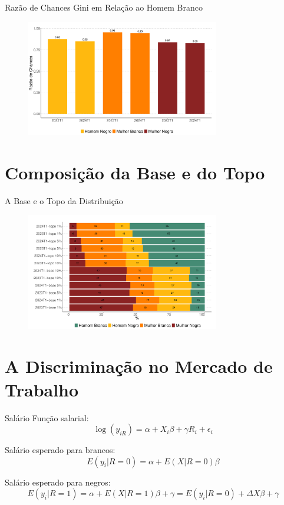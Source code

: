 \documentclass[10pt, xcolor=x11names,compress]{beamer}
\begin{document}
	
	\begin{frame}{Razão de Chances Gini em Relação ao Homem Branco}
		\begin{figure}
			\centering
			\includegraphics[width = 0.75\textwidth]{../figures_output/frac_gini.pdf}
		\end{figure}
	\end{frame}
	
	\section{Composição da Base e do Topo}
	\begin{frame}{A Base e o Topo da Distribuição}
		\begin{figure}
			\centering
			\includegraphics[width = 0.75\textwidth]{../figures_output/top_bottom.pdf}
		\end{figure}
	\end{frame}
	
\section{A Discriminação no Mercado de Trabalho}

\begin{frame}{Salário}
	Função salarial:
	\begin{equation}
		\log(y_{iR}) = \alpha + X_{i}\beta + \gamma R_{i} + \epsilon_{i}
	\end{equation}
	
	Salário esperado para brancos:
	\begin{equation}
		E(y_{i}|R=0) = \alpha + E(X|R=0)\beta
	\end{equation}
	
	Salário esperado para negros:
	\begin{equation}
		E(y_{i}|R=1) = \alpha + E(X|R=1)\beta + \gamma = E(y_{i}|R=0) + \Delta X\beta + \gamma
	\end{equation}
\end{frame}
\end{document}
